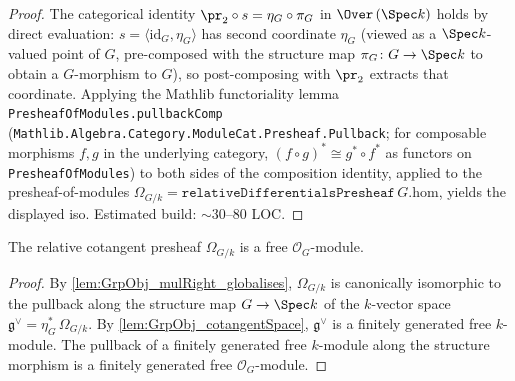 \begin{proof}
  
  \leanok
  The categorical identity \(\pr_{2} \circ s = \eta_{G} \circ \pi_{G}\) in \(\Over\,(\Spec k)\) holds by direct evaluation: \(s = \langle \mathrm{id}_{G}, \eta_{G} \rangle\) has second coordinate \(\eta_{G}\) (viewed as a \(\Spec k\)-valued point of \(G\), pre-composed with the structure map \(\pi_{G} \colon G \to \Spec k\) to obtain a \(G\)-morphism to \(G\)), so post-composing with \(\pr_{2}\) extracts that coordinate. Applying the Mathlib functoriality lemma \texttt{PresheafOfModules.pullbackComp} (\texttt{Mathlib.Algebra.Category.ModuleCat.Presheaf.Pullback}; for composable morphisms \(f, g\) in the underlying category, \((f \circ g)^{*} \cong g^{*} \circ f^{*}\) as functors on \texttt{PresheafOfModules}) to both sides of the composition identity, applied to the presheaf-of-modules \(\Omega_{G/k} = \texttt{relativeDifferentialsPresheaf}\,G.\mathrm{hom}\), yields the displayed iso. Estimated build: \(\sim 30\)--\(80\) LOC.
\end{proof}

\begin{lemma}
  \label{lem:GrpObj_omega_free}
  
  \notready
  The relative cotangent presheaf \(\Omega_{G/k}\) is a free \(\mathcal O_{G}\)-module.
\end{lemma}

\begin{proof}
  
  By \cref{lem:GrpObj_mulRight_globalises}, \(\Omega_{G/k}\) is canonically isomorphic to the pullback along the structure map \(G \to \Spec k\) of the \(k\)-vector space \(\mathfrak g^{\vee} = \eta_{G}^{*}\,\Omega_{G/k}\). By \cref{lem:GrpObj_cotangentSpace}, \(\mathfrak g^{\vee}\) is a finitely generated free \(k\)-module. The pullback of a finitely generated free \(k\)-module along the structure morphism is a finitely generated free \(\mathcal O_{G}\)-module.
\end{proof}

